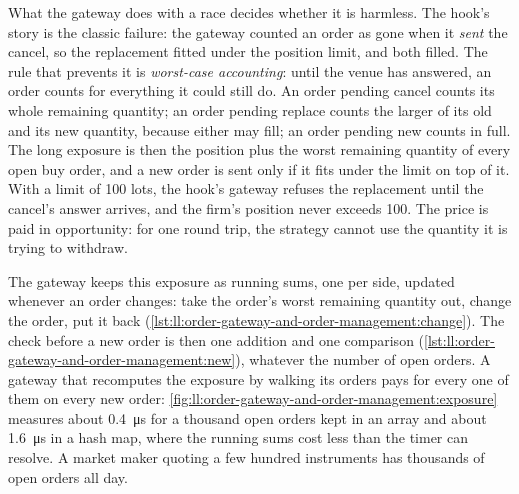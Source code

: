 What the gateway does with a race decides whether it is harmless. The hook's story is the classic failure: the gateway counted
an order as gone when it \emph{sent} the cancel, so the replacement fitted under the position limit, and both filled. The rule
that prevents it is \emph{worst-case accounting}: until the venue has answered, an order counts for everything it could still
do. An order pending cancel counts its whole remaining quantity; an order pending replace counts the larger of its old and its
new quantity, because either may fill; an order pending new counts in full. The long exposure is then the position plus the
worst remaining quantity of every open buy order, and a new order is sent only if it fits under the limit on top of it. With a
limit of 100 lots, the hook's gateway refuses the replacement until the cancel's answer arrives, and the firm's position never
exceeds 100. The price is paid in opportunity: for one round trip, the strategy cannot use the quantity it is trying to
withdraw.

The gateway keeps this exposure as running sums, one per side, updated whenever an order changes: take the order's worst
remaining quantity out, change the order, put it back (\cref{lst:ll:order-gateway-and-order-management:change}). The check
before a new order is then one addition and one comparison (\cref{lst:ll:order-gateway-and-order-management:new}), whatever
the number of open orders. A gateway that recomputes the exposure by walking its orders pays for every one of them on every
new order: \cref{fig:ll:order-gateway-and-order-management:exposure} measures about \qty{0.4}{\micro\second} for a thousand
open orders kept in an array and about \qty{1.6}{\micro\second} in a hash map, where the running sums cost less than the timer
can resolve. A market maker quoting a few hundred instruments has thousands of open orders all day.

\label{lst:ll:order-gateway-and-order-management:change}

\label{lst:ll:order-gateway-and-order-management:new}

